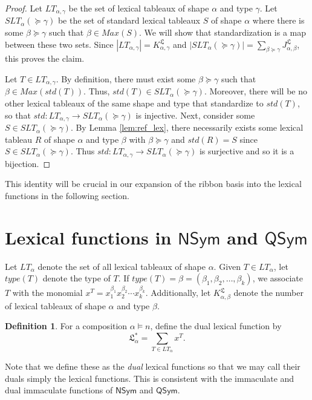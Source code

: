 \documentclass{amsart}
\theoremstyle{definition}
\newtheorem{definition}[theorem]{Definition}
\newcommand{\lx}{\mathfrak{L}}
\begin{document}
\begin{proof}
Let $LT_{\alpha,\gamma}$ be the set of lexical tableaux of shape $\alpha$ and type $\gamma$. Let $SLT_{\alpha}(\succeq\gamma)$ be the set of standard lexical tableaux $S$ of shape $\alpha$ where there is some $\beta \succeq \gamma$ such that $\beta \in Max(S)$. We will show that standardization is a map between these two sets. Since $|LT_{\alpha, \gamma}|=K^{\lx}_{\alpha, \gamma}$ and $|SLT_{\alpha}(\succeq \gamma)| = \sum_{\beta \succeq \gamma} J^{\lx}_{\alpha, \beta}$, this proves the claim.

Let $T \in LT_{\alpha, \gamma}$. By definition, there must exist some $\beta \succeq \gamma$ such that $\beta \in Max(std(T)).$ Thus, $std(T) \in SLT_{\alpha}(\succeq \gamma)$. Moreover, there will be no other lexical tableaux of the same shape and type that standardize to $std(T)$,  so that  $std: LT_{\alpha, \gamma} \rightarrow SLT_{\alpha}(\succeq \gamma)$ is injective. Next, consider some $S \in SLT_{\alpha}(\succeq \gamma)$. By Lemma \ref{lem:ref_lex}, there    necessarily
  exists some lexical tableau  $R$ of shape $\alpha$ and type $\beta$ with $\beta \succeq \gamma$ and $std(R)=S$ since $S \in SLT_{\alpha}(\succeq \gamma)$. Thus $std: LT_{\alpha, \gamma} \rightarrow SLT_{\alpha}(\succeq \gamma)$ is surjective and so it is a bijection. 
\end{proof}

This identity will be crucial in our expansion of the ribbon basis into the lexical functions in the following section. 

\section{Lexical functions in $\textsf{NSym}$ and $\textsf{QSym}$}\label{sectionqsym}
 Let $LT_{\alpha}$ denote the set of all  lexical tableaux of shape $\alpha$. Given $T \in LT_{\alpha}$, let $type(T)$ denote the
 type of $T$. If $type(T)=\beta= (\beta_1, \beta_2, \ldots, \beta_k)$, we associate $T$ with the monomial $x^T = x_1^{\beta_1} 
 x_2^{\beta_2} \cdots x_k^{\beta_k}$. Additionally, let $K^{\lx}_{\alpha,\beta}$ denote the number of lexical tableaux of shape 
 $\alpha$ and type $\beta$.

\begin{definition}
 For a composition $\alpha \vDash n$, define the dual lexical function by \[ \lx^*_{\alpha} = \sum_{T \in LT_{\alpha}} x^T.\]
\end{definition}

Note that we define these as the \emph{dual} lexical functions so that we may call their duals simply the lexical functions. This is consistent with the immaculate and dual immaculate functions of $\textsf{NSym}$ and $\textsf{QSym}$.
\end{document}
